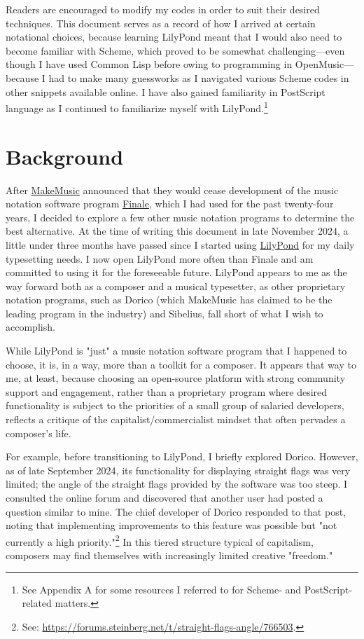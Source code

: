 \documentclass[11pt, oneside]{book}   	%
\begin{document}
Readers are encouraged to modify my codes in order to suit their desired techniques. This document serves as a record of how I arrived at certain notational choices, because learning LilyPond meant that I would also need to become familiar with Scheme, which proved to be somewhat challenging—even though I have used Common Lisp before owing to programming in OpenMusic—because I had to make many guessworks as I navigated various Scheme codes in other snippets available online. I have also gained familiarity in PostScript language as I continued to familiarize myself with LilyPond.\footnote{See Appendix A for some resources I referred to for Scheme- and PostScript-related matters.}
\section{Background}

After \href{https://www.makemusic.com/}{MakeMusic} announced that they would cease development of the music notation software program \href{https://www.finalemusic.com/}{Finale}, which I had used for the past twenty-four years, I decided to explore a few other music notation programs to determine the best alternative. At the time of writing this document in late November 2024, a little under three months have passed since I started using \href{https://lilypond.org/}{LilyPond} for my daily typesetting needs. I now open LilyPond more often than Finale and am committed to using it for the foreseeable future. LilyPond appears to me as the way forward both as a composer and a musical typesetter, as other proprietary notation programs, such as Dorico (which MakeMusic has claimed to be the leading program in the industry) and Sibelius, fall short of what I wish to accomplish. 

While LilyPond is "just" a music notation software program that I happened to choose, it is, in a way, more than a toolkit for a composer. It appears that way to me, at least, because choosing an open-source platform with strong community support and engagement, rather than a proprietary program where desired functionality is subject to the priorities of a small group of salaried developers, reflects a critique of the capitalist/commercialist mindset that often pervades a composer’s life.
  
For example, before transitioning to LilyPond, I briefly explored Dorico. However, as of late September 2024, its functionality for displaying straight flags was very limited; the angle of the straight flags provided by the software was too steep. I consulted the online forum and discovered that another user had posted a question similar to mine. The chief developer of Dorico responded to that post, noting that implementing improvements to this feature was possible but "not currently a high priority."\footnote{See: \url{https://forums.steinberg.net/t/straight-flags-angle/766503}.} In this tiered structure typical of capitalism, composers may find themselves with increasingly limited creative "freedom." 
\end{document}
